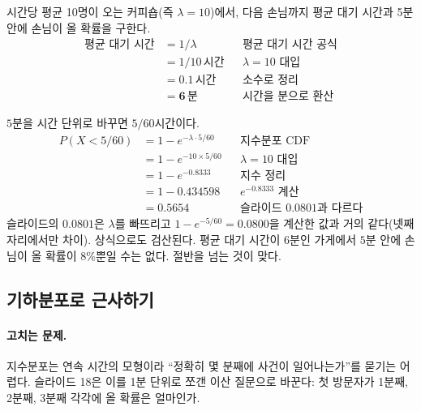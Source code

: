 \begin{example}[커피숍 손님 도착]
\label{ex:dist-coffee}
시간당 평균 10명이 오는 커피숍(즉 $\lambda = 10$)에서, 다음 손님까지
평균 대기 시간과 5분 안에 손님이 올 확률을 구한다.
\begin{align*}
  \text{평균 대기 시간} &= 1/\lambda           && \text{평균 대기 시간 공식}\\
    &= 1/10\,\text{시간}                        && \text{$\lambda=10$ 대입}\\
    &= 0.1\,\text{시간}                          && \text{소수로 정리}\\
    &= \mathbf{6}\,\text{분}                     && \text{시간을 분으로 환산}
\end{align*}
\end{example}

\begin{pitfall}
$5$분을 시간 단위로 바꾸면 $5/60$시간이다.
\begin{align*}
  P(X<5/60) &= 1 - e^{-\lambda \cdot 5/60}   && \text{지수분포 CDF}\\
            &= 1 - e^{-10\times 5/60}        && \text{$\lambda=10$ 대입}\\
            &= 1 - e^{-0.8333}               && \text{지수 정리}\\
            &= 1 - 0.434598                  && \text{$e^{-0.8333}$ 계산}\\
            &= \mathbf{0.5654}               && \text{슬라이드 0.0801과 다르다}
\end{align*}
슬라이드의 $\mathbf{0.0801}$은 $\lambda$를 빠뜨리고
$1-e^{-5/60} = \mathbf{0.0800}$을 계산한 값과 거의 같다(넷째 자리에서만
차이). 상식으로도 검산된다. 평균 대기 시간이 $6$분인 가게에서 $5$분
안에 손님이 올 확률이 $8\%$뿐일 수는 없다. 절반을 넘는 것이 맞다.
\end{pitfall}

\subsection{기하분포로 근사하기}
\label{subsec:geometric}

\paragraph{고치는 문제.} 지수분포는 연속 시간의 모형이라 ``정확히 몇 분째에
사건이 일어나는가''를 묻기는 어렵다. 슬라이드 18은 이를 1분 단위로 쪼갠
이산 질문으로 바꾼다: 첫 방문자가 1분째, 2분째, 3분째 각각에 올 확률은
얼마인가.

